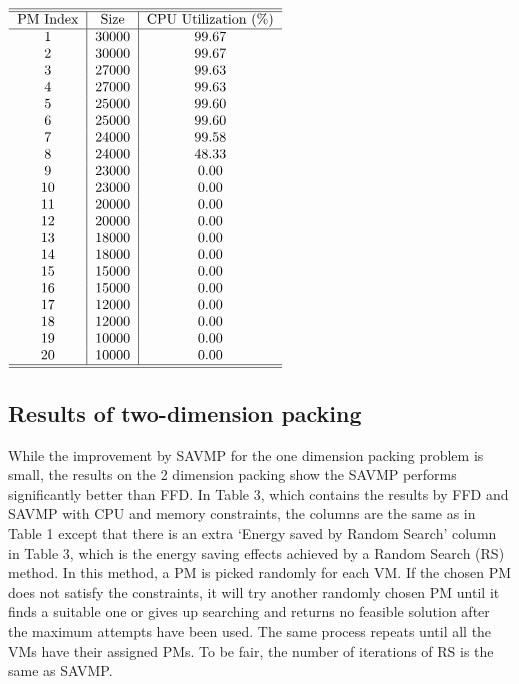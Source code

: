 \documentclass[10pt, conference, compsocconf]{IEEEtran}
\begin{document}
\begin{table}[h]
\begin{center}
\caption{VM placement results by FFD on 200 VMs
 with capacity index of 10}
$\begin{tabular}{c|c|c}
\hline\hline
PM Index & Size & CPU Utilization (\%) \\
\hline
1 & 30000 & 99.67\\
2 & 30000 & 99.67\\
3 & 27000 & 99.63 \\
4 & 27000 & 99.63 \\
5 & 25000 & 99.60 \\
6 & 25000 & 99.60\\
7 & 24000 & 99.58 \\
8 & 24000 & 48.33 \\
9 & 23000 & 0.00 \\
10 & 23000 & 0.00 \\
11 & 20000 & 0.00 \\
12 & 20000 & 0.00\\
13 & 18000 & 0.00\\
14 & 18000 & 0.00\\
15 & 15000 & 0.00\\
16 & 15000 & 0.00\\
17 & 12000 & 0.00\\
18 & 12000 & 0.00\\
19 & 10000 & 0.00\\
20 & 10000 & 0.00\\
\hline\hline
\end{tabular}$
\end{center}
\end{table}
\subsection{Results of two-dimension packing}
While the improvement by SAVMP for the one dimension packing problem is small,
the results on the 2 dimension packing show the SAVMP performs significantly
better than FFD. In Table 3, which contains the results by FFD and SAVMP with
CPU and memory constraints, the columns are the same as in Table 1 except that
there is an extra `Energy saved by Random Search' column in Table 3, which
is the energy saving effects achieved by a Random Search (RS) method. In this
method, a PM is picked randomly for each VM. If the chosen PM does not satisfy the
constraints, it will try another randomly chosen PM until it finds a suitable
one or gives up searching and returns no feasible solution after the maximum
attempts have been used. The same process repeats until all the VMs have their
assigned PMs. To be fair, the number of iterations of RS is the same as SAVMP. 
\end{document}
